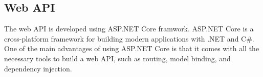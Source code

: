 \subsection{Web API}
The web API is developed using ASP.NET Core framwork. 
ASP.NET Core is a cross-platform framework for building modern applications with .NET and C\#.
One of the main advantages of using ASP.NET Core is that it comes with all the necessary tools
to build a web API, such as routing, model binding, and dependency injection.


